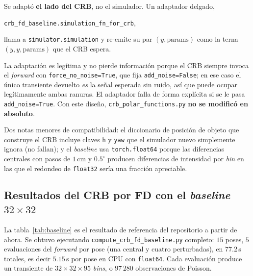 \documentclass[11pt,a4paper]{article}
\newcommand{\code}[1]{\texttt{#1}}
\theoremstyle{definition}
\begin{document}
Se adaptó \textbf{el lado del CRB}, no el simulador. Un adaptador delgado,
%
\begin{center}
\code{crb\_fd\_baseline.simulation\_fn\_for\_crb},
\end{center}
%
llama a \code{simulator.simulation} y re-emite su par $(y,\text{params})$ como
la terna $(y, y, \text{params})$ que el CRB espera.

La adaptación es legítima y no pierde información porque el CRB siempre invoca
el \emph{forward} con \code{force\_no\_noise=True}, que fija
\code{add\_noise=False}; en ese caso el único transiente devuelto \emph{es} la
señal esperada sin ruido, así que puede ocupar legítimamente ambas ranuras. El
adaptador falla de forma explícita si se le pasa \code{add\_noise=True}.
Con este diseño, \code{crb\_polar\_functions.py} \textbf{no se modificó en
absoluto}.

Dos notas menores de compatibilidad: el diccionario de posición de objeto que
construye el CRB incluye claves \code{h} y \code{yaw} que el simulador nuevo
simplemente ignora (no fallan); y el \emph{baseline} usa \code{torch.float64}
porque las diferencias centrales con pasos de $1\,$cm y $0.5^\circ$ producen
diferencias de intensidad por \emph{bin} en las que el redondeo de
\code{float32} sería una fracción apreciable.

\subsection{Resultados del CRB por FD con el \emph{baseline} $32\times32$}

La tabla~\ref{tab:baseline} es el resultado de referencia del repositorio a
partir de ahora. Se obtuvo ejecutando \code{compute\_crb\_fd\_baseline.py}
completo: $15$ poses, $5$ evaluaciones del \emph{forward} por pose (una central
y cuatro perturbadas), en $77.2\,$s totales, es decir $5.15\,$s por pose en CPU
con \code{float64}. Cada evaluación produce un transiente de
$32\times32\times95$ \emph{bins}, o $97\,280$ observaciones de Poisson.
\end{document}
